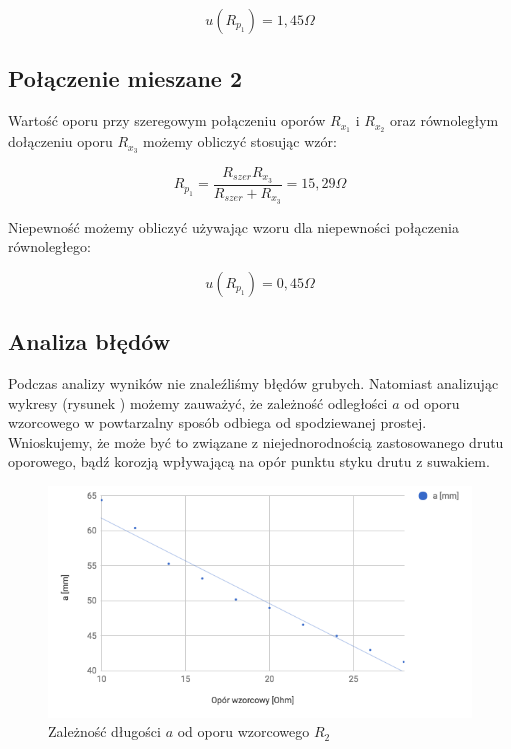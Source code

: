 \documentclass[a4paper,10pt,twoside]{article}
\begin{document}
$$ u(R_{p_1}) = 1,45 \unit{\Omega} $$

\subsection{Połączenie mieszane 2}

Wartość oporu przy szeregowym połączeniu oporów $R_{x_1}$ i $R_{x_2}$ oraz równoległym dołączeniu oporu $R_{x_3}$ możemy obliczyć stosując wzór:

$$ R_{p_1} = \frac{R_{szer} R_{x_3}}{R_{szer} + R_{x_3}} = 15,29 \unit{\Omega} $$

Niepewność możemy obliczyć używając wzoru dla niepewności połączenia równoległego:

$$ u(R_{p_1}) = 0,45 \unit{\Omega} $$

\subsection{Analiza błędów}

Podczas analizy wyników nie znaleźliśmy błędów grubych. Natomiast analizując wykresy (rysunek ) możemy zauważyć, że zależność odległości $a$ od oporu wzorcowego w powtarzalny sposób odbiega od spodziewanej prostej. Wnioskujemy, że może być to związane z niejednorodnością zastosowanego drutu oporowego, bądź korozją wpływającą na opór punktu styku drutu z suwakiem.

\begin{figure}[!htp]
\centerline{\includegraphics[scale=0.5]{wykres_r2.png}}
\caption{Zależność długości $a$ od oporu wzorcowego $R_2$}
\label{fig:wykres_r2}
\end{figure}
\end{document}
